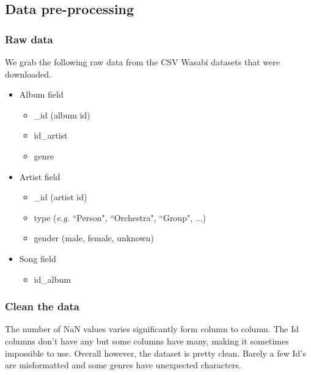 \documentclass{article}
\begin{document}
\subsection{Data pre-processing}
\subsubsection{Raw data}

We grab the following raw data from the CSV Wasabi datasets that were downloaded.
\begin{itemize}
    \item Album field
          \begin{itemize}
              \item \_id (album id)
              \item id\_artist
              \item genre
          \end{itemize}
    \item Artist field
          \begin{itemize}
              \item \_id (artist id)
              \item type (\textit{e.g.} ``Person", ``Orchestra", ``Group", ...)
              \item gender (male, female, unknown)
          \end{itemize}
    \item Song field
          \begin{itemize}
              \item id\_album
          \end{itemize}
\end{itemize}

\subsubsection{Clean the data}
The number of NaN values varies significantly form column to column. The Id columns don't have any but some columns have many, making it sometimes impossible to use.
Overall however, the dataset is pretty clean. Barely a few Id's are misformatted and some genres have unexpected characters.
\end{document}
